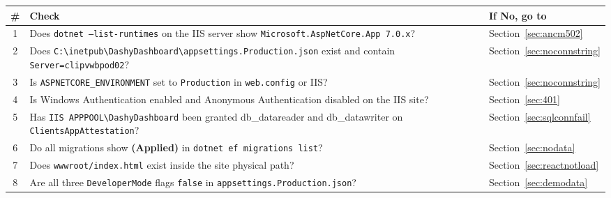 \documentclass[a4paper,11pt]{article}
\begin{document}
\bigskip
\renewcommand{\arraystretch}{1.5}
\begin{tabularx}{\linewidth}{|c|X|X|}
\hline
\textbf{\#} & \textbf{Check} & \textbf{If No, go to} \\
\hline
1 &
  Does \texttt{dotnet --list-runtimes} on the IIS server show
  \texttt{Microsoft.AspNetCore.App 7.0.x}? &
  Section~\ref{sec:ancm502} \\
\hline
2 &
  Does \texttt{C:\textbackslash inetpub\textbackslash DashyDashboard\textbackslash appsettings.Production.json}
  exist and contain \texttt{Server=clipvwbpod02}? &
  Section~\ref{sec:noconnstring} \\
\hline
3 &
  Is \texttt{ASPNETCORE\_ENVIRONMENT} set to \texttt{Production}
  in \texttt{web.config} or IIS? &
  Section~\ref{sec:noconnstring} \\
\hline
4 &
  Is Windows Authentication enabled and Anonymous Authentication disabled
  on the IIS site? &
  Section~\ref{sec:401} \\
\hline
5 &
  Has \texttt{IIS APPPOOL\textbackslash DashyDashboard} been granted
  db\_datareader and db\_datawriter on \texttt{ClientsAppAttestation}? &
  Section~\ref{sec:sqlconnfail} \\
\hline
6 &
  Do all migrations show \textbf{(Applied)} in
  \texttt{dotnet ef migrations list}? &
  Section~\ref{sec:nodata} \\
\hline
7 &
  Does \texttt{wwwroot/index.html} exist inside the site physical path? &
  Section~\ref{sec:reactnotload} \\
\hline
8 &
  Are all three \texttt{DeveloperMode} flags \texttt{false}
  in \texttt{appsettings.Production.json}? &
  Section~\ref{sec:demodata} \\
\hline
\end{tabularx}
\renewcommand{\arraystretch}{1}
\end{document}
